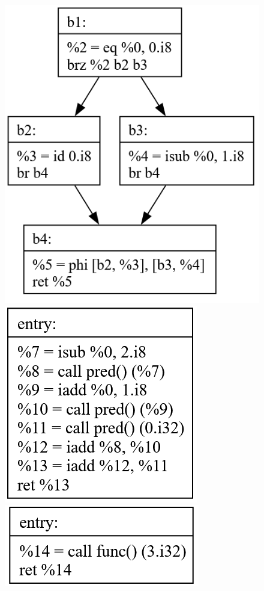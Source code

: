\documentclass[11pt, a4paper, titlepage]{article}
\begin{document}
\begin{figure}[H]
  \centering
  \includegraphics[scale=0.3]{images/i32.png}
  \includegraphics[scale=0.3]{images/i33.png}
  \includegraphics[scale=0.3]{images/i34.png}
\end{figure}
\end{document}
